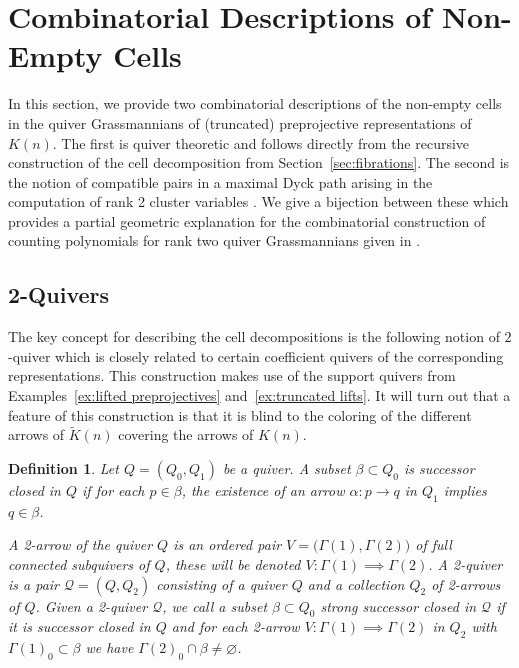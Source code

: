 \documentclass{amsart}
\newtheorem{definition}[theorem]{Definition}
\numberwithin{equation}{section}
\newcommand{\cQ}{\mathcal{Q}}
\begin{document}
\section{Combinatorial Descriptions of Non-Empty Cells}
\label{sec:combinatorics}
\noindent In this section, we provide two combinatorial descriptions of the non-empty cells in the quiver Grassmannians of (truncated) preprojective representations of $K(n)$.
The first is quiver theoretic and follows directly from the recursive construction of the cell decomposition from Section~\ref{sec:fibrations}.
The second is the notion of compatible pairs in a maximal Dyck path arising in the computation of rank 2 cluster variables \cite{llz}.
We give a bijection between these which provides a partial geometric explanation for the combinatorial construction of counting polynomials for rank two quiver Grassmannians given in \cite{rupel}.

\subsection{2-Quivers}\label{sec:2quivers}

The key concept for describing the cell decompositions is the following notion of $2$-quiver which is closely related to certain coefficient quivers of the corresponding representations.
This construction makes use of the support quivers from Examples~\ref{ex:lifted preprojectives} and~\ref{ex:truncated lifts}.
It will turn out that a feature of this construction is that it is blind to the coloring of the different arrows of $\widetilde K(n)$ covering the arrows of $K(n)$.
\begin{definition}
  Let $Q=(Q_0,Q_1)$ be a quiver.
  A subset $\beta\subset Q_0$ is \emph{successor closed in $Q$} if for each $p\in\beta$, the existence of an arrow $\alpha:p\to q$ in $Q_1$ implies $q\in\beta$.

  A \emph{2-arrow} of the quiver $Q$ is an ordered pair $V=\big(\Gamma(1),\Gamma(2)\big)$ of full connected subquivers of $Q$, these will be denoted $V:\Gamma(1)\implies\Gamma(2)$.
  A \emph{2-quiver} is a pair $\cQ=(Q,Q_2)$ consisting of a quiver $Q$ and a collection $Q_2$ of 2-arrows of $Q$.
  Given a 2-quiver $\cQ$, we call a subset $\beta\subset Q_0$ \emph{strong successor closed in $\cQ$} if it is successor closed in $Q$ and for each 2-arrow $V:\Gamma(1)\implies\Gamma(2)$ in $Q_2$ with $\Gamma(1)_0\subset\beta$ we have $\Gamma(2)_0\cap\beta\ne\varnothing$.  
\end{definition}
\end{document}
